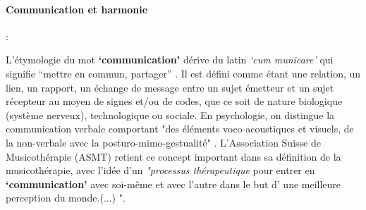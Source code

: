 \paragraph{Communication et harmonie}:


L'étymologie du mot  \textbf{`communication'} dérive du latin  \textit{`cum
  municare'} qui signifie ``mettre en commun, partager'' \autocite{dicpetitrobert}.
Il est défini comme étant une
relation, un lien, un rapport, un échange de message entre un sujet émetteur et un
sujet récepteur au moyen de signes et/ou de codes, que ce soit de nature biologique (système nerveux), technologique ou sociale. En psychologie, on distingue la communication verbale comportant "des éléments voco-acoustiques et visuels, de la non-verbale avec la posturo-mimo-gestualité" \autocite{doronparot}.
L'Association Suisse
de Musicothérapie (ASMT) retient ce concept important dans sa définition de la musicothérapie, avec l'idée  d'un\textit{ "processus thérapeutique }pour entrer en \textbf{`communication'} avec soi-même et avec
l'autre dans le but d' une meilleure perception du
monde.(...) "\autocite{site_musitherapy}.

